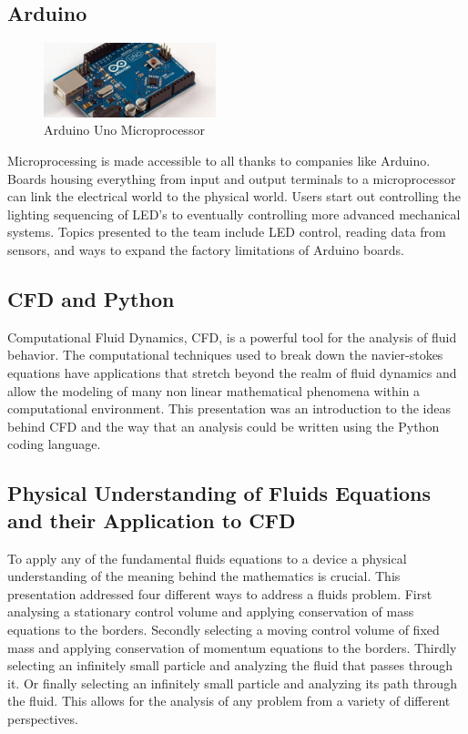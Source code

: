 \documentclass{report}
\begin{document}
\subsection{Arduino}
\begin{figure}[h]
\centering
\includegraphics[width=5cm]{"Arduino UNO"}
\caption{Arduino Uno Microprocessor}
\end{figure}
Microprocessing is made accessible to all thanks to companies like Arduino.  Boards housing everything from input and output terminals to a microprocessor can link the electrical world to the physical world.  Users start out controlling the lighting sequencing of LED’s to eventually controlling more advanced mechanical systems.  Topics presented to the team include LED control, reading data from sensors, and ways to expand the factory limitations of Arduino boards.  
\subsection{CFD and Python}
Computational Fluid Dynamics, CFD, is a powerful tool for the analysis of fluid behavior. The computational techniques used to break down the navier-stokes equations have applications that stretch beyond the realm of fluid dynamics and allow the modeling of many non linear mathematical phenomena within a computational environment. This presentation was an introduction to the ideas behind CFD and the way that an analysis could be written using the Python coding language.
\subsection{Physical Understanding of Fluids Equations and their Application to CFD}
To apply any of the fundamental fluids equations to a device a physical understanding of the meaning behind the mathematics is crucial. This presentation addressed four different ways to address a fluids problem. First analysing a stationary control volume and applying conservation of mass equations to the borders. Secondly selecting a moving control volume of fixed mass and applying conservation of momentum equations to the borders. Thirdly selecting an infinitely small particle and analyzing the fluid that passes through it. Or finally selecting an infinitely small particle and analyzing its path through the fluid. This allows for the analysis of any problem from a variety of different perspectives.
\end{document}
